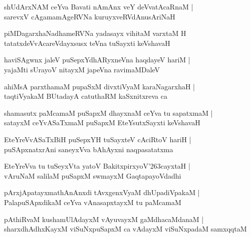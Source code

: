 \documentclass[twoside,12pt,openright]{book}
\def\S{\char'263}
\newcounter{shloka}[chapter]
\begin{document}
\begin{shloka}%
shUdArxNAM ceYva Bavati nAmAnx veY deVvatAcaRnaM |\\
sarevxV cAgamamAgeRVNa kuruyxveRVdAnusAriNaH
\end{shloka}

\begin{shloka}%
piMDagarxhaNadhameRVNa yadasayx vihitaM varxtaM H \\
tatatxdeVvAcareVdayxsusx teVna tuSayxti keVshavaH 
\end{shloka}

\begin{shloka}%
haviSAgwnx jaleV puSepxYdhARyxneVna haqdayeV hariM |\\
yajaMti sUrayoV nitayxM japeVna ravimaMDaleV 
\end{shloka}

\begin{shloka}%
ahiMsA parxthamaM pupaSxM divxtiVyaM karaNagarxhaH |\\
taqtiVyakaM BUtadayA catuthaRM kaSxnitxreva ca 
\end{shloka}

\begin{shloka}%
shamasutx paMcamaM puSapxM  dhayxnaM ceYva tu sapatxmaM |\\
satayxM ceYvASaTxmaM puSapxM EteYsutxSayxti keVshavaH 
\end{shloka}

\begin{shloka}%
EteYreVvASaTxBiH puSepxYH tuSayxteV cAciRtoV hariH |\\
puSApxnatxrAni saneyxVva bAhAyxni naqpasatatxma
\end{shloka}

\begin{shloka}%
EteYreVva tu tuSeyxVta yatoV BakitxpirxyoV\S cayxtaH |\\
vAruNaM salilaM puSapxM swmayxM GaqtapayoVdadhi
\end{shloka}

\begin{shloka}%
pArxjApatayxmathAnAnxdi tAvxgenxVyaM dhUpadiVpakaM |\\
PalapuSApxdikaM ceYva vAnasapxtayxM tu paMcamaM 
\end{shloka}

\begin{shloka}%
pAthiRvaM kushamUlAdayxM vAyuvayxM gaMdhacaMdanaM |\\
sharxdhAdhxKayxM viSuNxpuSapxM ca vAdayxM viSuNxpadaM samxqqtaM 
\end{shloka}
\end{document}
